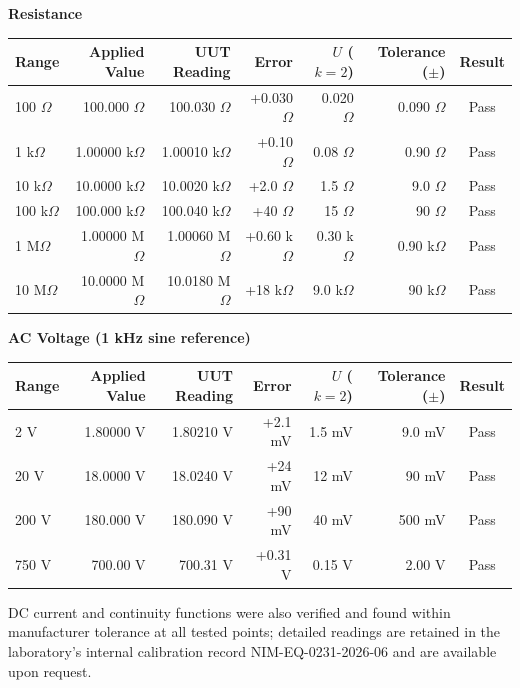 \vspace{8pt}
{\small\sffamily\bfseries\color{certnavy} Resistance}
\vspace{2pt}
\begin{center}
\small
\begin{tabular}{@{}lrrrrrc@{}}
  \toprule
  Range & Applied Value & UUT Reading & Error & $U$ ($k=2$) & Tolerance ($\pm$) & Result \\
  \midrule
  100 $\Omega$   & 100.000 $\Omega$  & 100.030 $\Omega$ & +0.030 $\Omega$ & 0.020 $\Omega$ & 0.090 $\Omega$ & \textcolor{certpass}{Pass} \\
  1 k$\Omega$    & 1.00000 k$\Omega$ & 1.00010 k$\Omega$ & +0.10 $\Omega$ & 0.08 $\Omega$ & 0.90 $\Omega$ & \textcolor{certpass}{Pass} \\
  10 k$\Omega$   & 10.0000 k$\Omega$ & 10.0020 k$\Omega$ & +2.0 $\Omega$ & 1.5 $\Omega$ & 9.0 $\Omega$ & \textcolor{certpass}{Pass} \\
  100 k$\Omega$  & 100.000 k$\Omega$ & 100.040 k$\Omega$ & +40 $\Omega$ & 15 $\Omega$ & 90 $\Omega$ & \textcolor{certpass}{Pass} \\
  1 M$\Omega$    & 1.00000 M$\Omega$ & 1.00060 M$\Omega$ & +0.60 k$\Omega$ & 0.30 k$\Omega$ & 0.90 k$\Omega$ & \textcolor{certpass}{Pass} \\
  10 M$\Omega$   & 10.0000 M$\Omega$ & 10.0180 M$\Omega$ & +18 k$\Omega$ & 9.0 k$\Omega$ & 90 k$\Omega$ & \textcolor{certpass}{Pass} \\
  \bottomrule
\end{tabular}
\end{center}

\vspace{8pt}
{\small\sffamily\bfseries\color{certnavy} AC Voltage (1 kHz sine reference)}
\vspace{2pt}
\begin{center}
\small
\begin{tabular}{@{}lrrrrrc@{}}
  \toprule
  Range & Applied Value & UUT Reading & Error & $U$ ($k=2$) & Tolerance ($\pm$) & Result \\
  \midrule
  2 V   & 1.80000 V & 1.80210 V & +2.1 mV & 1.5 mV & 9.0 mV & \textcolor{certpass}{Pass} \\
  20 V  & 18.0000 V & 18.0240 V & +24 mV  & 12 mV  & 90 mV  & \textcolor{certpass}{Pass} \\
  200 V & 180.000 V & 180.090 V & +90 mV  & 40 mV  & 500 mV & \textcolor{certpass}{Pass} \\
  750 V & 700.00 V  & 700.31 V  & +0.31 V & 0.15 V & 2.00 V & \textcolor{certpass}{Pass} \\
  \bottomrule
\end{tabular}
\end{center}

{\small\color{certgray} DC current and continuity functions were also verified and found
within manufacturer tolerance at all tested points; detailed readings are retained in the
laboratory's internal calibration record NIM-EQ-0231-2026-06 and are available upon
request.}
